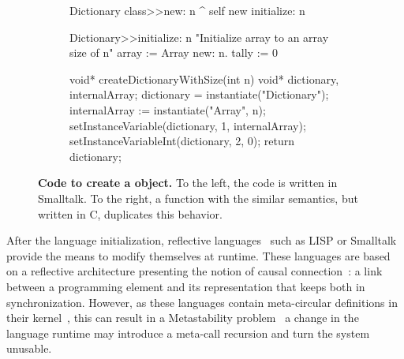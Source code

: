 \begin{figure}[ht]
\begin{subfigure}{.5\linewidth}
\begin{code}
Dictionary class>>new: n
    ^ self new initialize: n

Dictionary>>initialize: n
    "Initialize array to an array size of n"
    array := Array new: n.
    tally := 0
\end{code}
\end{subfigure}
\begin{subfigure}{.5\linewidth}
\begin{code}
void* createDictionaryWithSize(int n){
    void* dictionary, internalArray;
    dictionary = instantiate("Dictionary");
    internalArray := instantiate("Array", n);
    setInstanceVariable(dictionary, 1, internalArray);
    setInstanceVariableInt(dictionary, 2, 0);
    return dictionary;
}
\end{code}
\end{subfigure}
\caption{\textbf{Code to create a  object.} To the left, the code is written in Smalltalk. To the right, a function with the similar semantics, but written in C, duplicates this behavior.\label{code:logic_dup}}
\end{figure}



After the language initialization, reflective languages~\cite{Smit84a} such as LISP or Smalltalk provide the means to modify themselves at runtime. These languages are based on a reflective architecture presenting the notion of causal connection~\cite{Maes87a}: a link between a programming element and its representation that keeps both in synchronization. However, as these languages contain meta-circular definitions in their kernel~\cite{Chib96a}, this can result in a Metastability problem~\cite{Kicz91a} \ie a change in the language runtime may introduce a meta-call recursion and turn the system unusable.%

